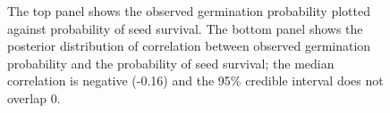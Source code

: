\documentclass[12pt, oneside, titlepage]{article}   	%
\begin{document}
\begin{figure}
 \caption{ The top panel shows the observed germination probability plotted against probability of seed survival. The bottom panel shows the posterior distribution of correlation between observed germination probability and the probability of seed survival; the median correlation is negative (-0.16) and the 95\% credible interval does not overlap 0. }
 
 \end{figure}

\clearpage

\end{document}
